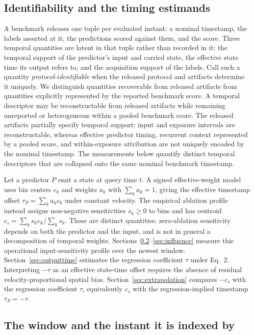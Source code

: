 \documentclass[10pt,twocolumn,letterpaper]{article}
\begin{document}
\subsection{Identifiability and the timing estimands}

A benchmark releases one tuple per evaluated instant: a nominal timestamp, the
labels asserted at it, the predictions scored against them, and the score. Three
temporal quantities are latent in that tuple rather than recorded in it: the temporal
support of the predictor's input and carried state, the effective state time its output
refers to, and the acquisition support of the labels. Call such a quantity
\emph{protocol-identifiable} when the released protocol and artifacts determine it uniquely.
We distinguish quantities recoverable from released artifacts from quantities explicitly
represented by the reported benchmark score. A temporal
descriptor may be reconstructable from released artifacts while remaining unreported or
heterogeneous within a pooled benchmark score. The released artifacts partially specify
temporal support: input and exposure intervals are reconstructable, whereas effective
predictor timing, recurrent context represented by a pooled score, and within-exposure
attribution are not uniquely encoded by the nominal timestamp.
The measurements below quantify distinct temporal descriptors that are collapsed onto the same
nominal benchmark timestamp.

Let a predictor $P$ emit a state at query time $t$. A signed effective-weight
model uses bin centers $c_k$ and weights $a_k$ with $\sum_k a_k=1$, giving the
effective timestamp offset $\tau_P=\sum_k a_kc_k$ under constant velocity. The
empirical ablation profile instead assigns non-negative sensitivities $s_k\geq0$
to bins and has centroid $c_s=\sum_k s_kc_k/\sum_k s_k$. These are distinct
quantities: zero-ablation sensitivity depends on both the predictor and the
input, and is not in general a decomposition of temporal weights. Sections~\ref{sec:window}--\ref{sec:influence} measure this
operational input-sensitivity profile over the newest window. Section~\ref{sec:outputtime}
estimates the regression coefficient $\tau$ under Eq.~2. Interpreting $-\tau$ as an
effective state-time offset requires the absence of residual velocity-proportional
spatial bias.
Section~\ref{sec:extrapolation} compares $-c_s$ with the regression coefficient
$\tau$, equivalently $c_s$ with the regression-implied timestamp $\tau_P=-\tau$.

\subsection{The window and the instant it is indexed by}
\label{sec:window}
\end{document}
